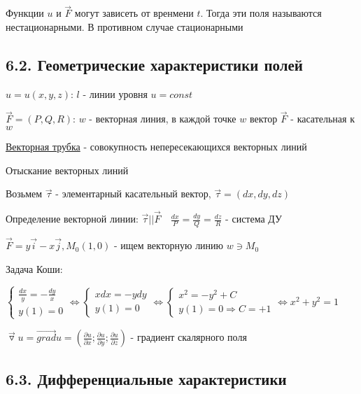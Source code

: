 \documentclass[12pt]{article}
\begin{document}
    \Nota Функции $u$ и $\overrightarrow{F}$ могут зависеть от вренмени $t$. Тогда эти поля называются нестационарными. В противном случае стационарными

    \hypertarget{scalarandvectorfieldgeometric}{}

    \subsection{6.2. Геометрические характеристики полей}

    $u = u(x, y, z)$: $l$ - линии уровня $u = const$

    $\overrightarrow{F} = (P, Q, R)$: $w$ - векторная линия, в каждой точке $w$ вектор $\overrightarrow{F}$ - касательная к $w$

    \underline{Векторная трубка} - совокупность непересекающихся векторных линий

    \Nota Отыскание векторных линий

    Возьмем $\overrightarrow{\tau}$ - элементарный касательный вектор, $\overrightarrow{\tau} = (dx, dy, dz)$

    Определение векторной линии: $\overrightarrow{\tau} || \overrightarrow{F} \quad \frac{dx}{P} = \frac{dy}{Q} = \frac{dz}{R}$ - система ДУ

    \Ex $\overrightarrow{F} = y \overrightarrow{i} - x \overrightarrow{j}, M_0 (1, 0)$ - ищем векторную линию $w \ni M_0$

    Задача Коши:

    $\begin{cases}
        \frac{dx}{y} = -\frac{dy}{x} \\ y(1) = 0
    \end{cases} \Longleftrightarrow \begin{cases}
        xdx = -ydy \\ y(1) = 0
    \end{cases} \Longleftrightarrow \begin{cases}
        x^2 = -y^2 + C \\ y(1) = 0 \Longrightarrow C = +1
    \end{cases} \Longleftrightarrow x^2 + y^2 = 1 $

    \hypertarget{differentialcharacteristics}{}


    \Mems $\overrightarrow{\triangledown}u = \overrightarrow{grad}u = \left(\frac{\partial u}{\partial x}; \frac{\partial u}{\partial y}; \frac{\partial u}{\partial z}\right)$ - градиент скалярного поля
    \subsection{6.3. Дифференциальные характеристики}
\end{document}
